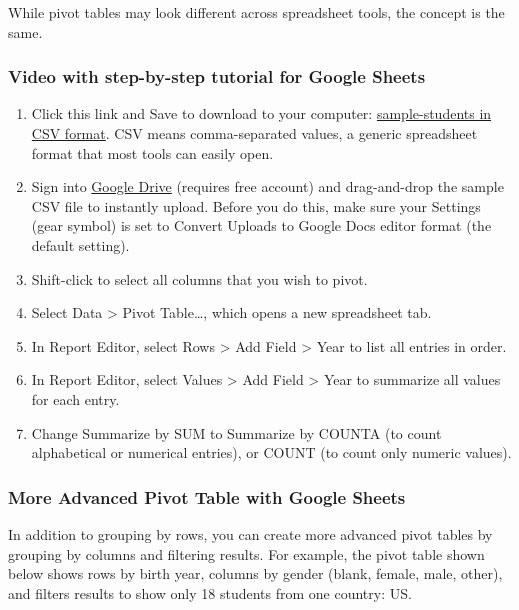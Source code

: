 \documentclass[
  english,
]{book}
\begin{document}
While pivot tables may look different across spreadsheet tools, the concept is the same.

\hypertarget{video-with-step-by-step-tutorial-for-google-sheets}{%
\subsubsection*{Video with step-by-step tutorial for Google Sheets}\label{video-with-step-by-step-tutorial-for-google-sheets}}

\begin{enumerate}
\def\labelenumi{\arabic{enumi})}
\item
  Click this link and Save to download to your computer: \href{data/sample-students.csv}{sample-students in CSV format}. CSV means comma-separated values, a generic spreadsheet format that most tools can easily open.
\item
  Sign into \href{http://drive.google.com}{Google Drive} (requires free account) and drag-and-drop the sample CSV file to instantly upload. Before you do this, make sure your Settings (gear symbol) is set to Convert Uploads to Google Docs editor format (the default setting).
\item
  Shift-click to select all columns that you wish to pivot.
\item
  Select Data \textgreater{} Pivot Table\ldots, which opens a new spreadsheet tab.
\item
  In Report Editor, select Rows \textgreater{} Add Field \textgreater{} Year to list all entries in order.
\item
  In Report Editor, select Values \textgreater{} Add Field \textgreater{} Year to summarize all values for each entry.
\item
  Change Summarize by SUM to Summarize by COUNTA (to count alphabetical or numerical entries), or COUNT (to count only numeric values).
\end{enumerate}

\hypertarget{more-advanced-pivot-table-with-google-sheets}{%
\subsubsection*{More Advanced Pivot Table with Google Sheets}\label{more-advanced-pivot-table-with-google-sheets}}

In addition to grouping by rows, you can create more advanced pivot tables by grouping by columns and filtering results. For example, the pivot table shown below shows rows by birth year, columns by gender (blank, female, male, other), and filters results to show only 18 students from one country: US.
\end{document}
